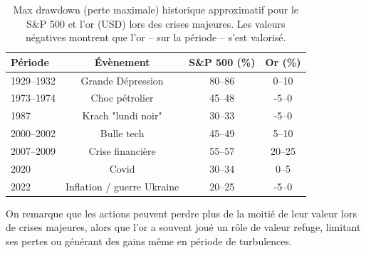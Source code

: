 \documentclass[12pt,a4paper]{article}
\begin{document}
\begin{table}[h!]
\centering
\begin{tabular}{lccc}
\toprule
Période & Évènement & S\&P 500 (\%) & Or (\%) \\
\midrule
1929--1932  & Grande Dépression             & 80--86  & 0--10 \\
1973--1974  & Choc pétrolier                & 45--48  & -5--0 \\
1987        & Krach "lundi noir"            & 30--33  & -5--0 \\
2000--2002  & Bulle tech                    & 45--49  & 5--10 \\
2007--2009  & Crise financière              & 55--57  & 20--25 \\
2020        & Covid                         & 30--34  & 0--5 \\
2022        & Inflation / guerre Ukraine    & 20--25  & -5--0 \\
\bottomrule
\end{tabular}
\caption{Max drawdown (perte maximale) historique approximatif pour le S\&P 500 et
l'or (USD) lors des crises majeures. Les valeurs négatives montrent que l'or
-- sur la période -- s'est valorisé.}
\label{tab:mdd_crises}
\end{table}

\noindent
On remarque que les actions peuvent perdre plus de la moitié de leur valeur
lors de crises majeures, alors que l'or a souvent joué un rôle de valeur
refuge, limitant ses pertes ou générant des gains même en période de
turbulences.
\end{document}
